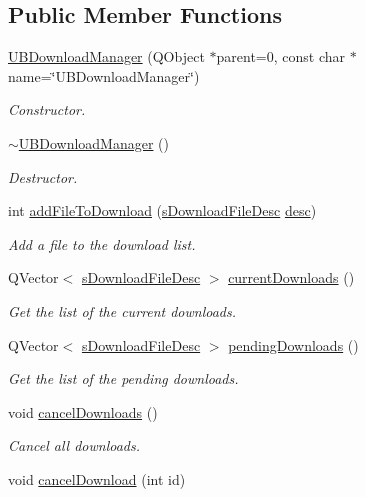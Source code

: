\subsection*{Public Member Functions}
\begin{DoxyCompactItemize}
\item 
\hyperlink{class_u_b_download_manager_a692880b623fa16bda278a35de605db8c}{U\-B\-Download\-Manager} (Q\-Object $\ast$parent=0, const char $\ast$name=\char`\"{}U\-B\-Download\-Manager\char`\"{})
\begin{DoxyCompactList}\small\item\em Constructor. \end{DoxyCompactList}\item 
\hyperlink{class_u_b_download_manager_a9950f99fdb58538f60e3d7a629fb6354}{$\sim$\-U\-B\-Download\-Manager} ()
\begin{DoxyCompactList}\small\item\em Destructor. \end{DoxyCompactList}\item 
int \hyperlink{class_u_b_download_manager_a1256f03bf7e614a35236fcd55ebdbdb6}{add\-File\-To\-Download} (\hyperlink{structs_download_file_desc}{s\-Download\-File\-Desc} \hyperlink{_u_b_http_get_8cpp_afde83e8a66b1328a06c071b0cc7e6f36}{desc})
\begin{DoxyCompactList}\small\item\em Add a file to the download list. \end{DoxyCompactList}\item 
Q\-Vector$<$ \hyperlink{structs_download_file_desc}{s\-Download\-File\-Desc} $>$ \hyperlink{class_u_b_download_manager_acefaa070ff6fcbabb908d16e4a807b59}{current\-Downloads} ()
\begin{DoxyCompactList}\small\item\em Get the list of the current downloads. \end{DoxyCompactList}\item 
Q\-Vector$<$ \hyperlink{structs_download_file_desc}{s\-Download\-File\-Desc} $>$ \hyperlink{class_u_b_download_manager_a4beef0fa708d68bcf92f73b029ed9f60}{pending\-Downloads} ()
\begin{DoxyCompactList}\small\item\em Get the list of the pending downloads. \end{DoxyCompactList}\item 
void \hyperlink{class_u_b_download_manager_a9ec94b78d3b4eb2d003657590f3a2839}{cancel\-Downloads} ()
\begin{DoxyCompactList}\small\item\em Cancel all downloads. \end{DoxyCompactList}\item 
void \hyperlink{class_u_b_download_manager_a5425576229c8b6918a72ca6476e2be23}{cancel\-Download} (int id)
\end{DoxyCompactItemize}
